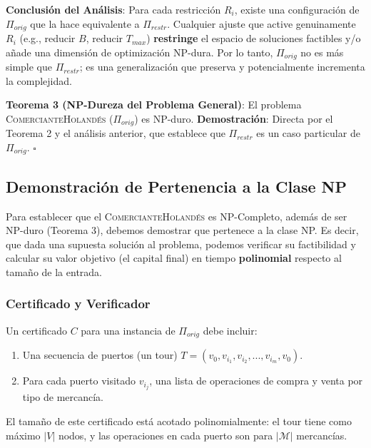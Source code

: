 \documentclass{article}
\begin{document}
\textbf{Conclusión del Análisis}: Para cada restricción $R_i$, existe una configuración de $\Pi_{orig}$ que la hace equivalente a $\Pi_{restr}$. Cualquier ajuste que active genuinamente $R_i$ (e.g., reducir $B$, reducir $T_{max}$) \textbf{restringe} el espacio de soluciones factibles y/o añade una dimensión de optimización NP-dura. Por lo tanto, $\Pi_{orig}$ no es más simple que $\Pi_{restr}$; es una generalización que preserva y potencialmente incrementa la complejidad.

\textbf{Teorema 3 (NP-Dureza del Problema General)}: El problema \textsc{ComercianteHolandés} ($\Pi_{orig}$) es NP-duro.
\textbf{Demostración}: Directa por el Teorema 2 y el análisis anterior, que establece que $\Pi_{restr}$ es un caso particular de $\Pi_{orig}$. \hfill $\square$

\subsection{Demonstración de Pertenencia a la Clase NP} \label{subsec:
pertenencia_np}

Para establecer que el \textsc{ComercianteHolandés} es NP-Completo, además de
ser NP-duro (Teorema 3), debemos demostrar que pertenece a la clase NP. Es decir,
que dada una supuesta solución al problema, podemos verificar su factibilidad y
calcular su valor objetivo (el capital final) en tiempo \textbf{polinomial}
respecto al tamaño de la entrada.

\subsubsection*{Certificado y Verificador} Un certificado $C$ para una
instancia de $\Pi_{orig}$ debe incluir: \begin{enumerate} \item Una secuencia de
puertos (un tour) $T = (v_0, v_{i_1}, v_{i_2}, ..., v_{i_m}, v_0)$. \item Para
cada puerto visitado $v_{i_j}$, una lista de operaciones de compra y venta por
tipo de mercancía. \end{enumerate}

El tamaño de este certificado está acotado polinomialmente: el tour tiene como
máximo $|V|$ nodos, y las operaciones en cada puerto son para $|\mathcal{M}|$
mercancías.
\end{document}
